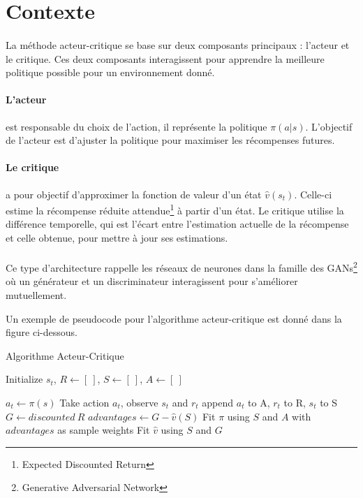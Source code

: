 \section{Contexte}

\paragraph{}
La méthode acteur-critique se base sur deux composants principaux : l'acteur et le critique. 
Ces deux composants interagissent pour apprendre la meilleure politique possible pour un environnement donné.

\paragraph{L'acteur} est responsable du choix de l'action, il représente la politique $\pi(a|s)$. 
L'objectif de l'acteur est d'ajuster la politique pour maximiser les récompenses futures.

\paragraph{Le critique} a pour objectif d'approximer la fonction de valeur d'un état $\hat{v}(s_t)$. 
Celle-ci estime la récompense réduite attendue\footnote{Expected Discounted Return} à partir d'un état.
Le critique utilise la différence temporelle, 
qui est l'écart entre l'estimation actuelle de la récompense et celle obtenue, pour mettre à jour ses estimations.

\paragraph{}
Ce type d'architecture rappelle les réseaux de neurones dans la famille des GANs\footnote{Generative Adversarial Network} 
où un générateur et un discriminateur interagissent pour s'améliorer mutuellement.


Un exemple de pseudocode pour l'algorithme acteur-critique est donné dans la figure ci-dessous.
\begin{algorithm}
\caption{Algorithme Acteur-Critique}\label{alg:a2c}
\begin{algorithmic}

\State Initialize $s_t$, $R \gets [~]$, $S \gets [~]$, $A \gets [~]$

\State $a_t \gets \pi(s)$ 
\State Take action $a_t$, observe $s_t$ and $r_t$
\State append $a_t$ to A, $r_t$ to R, $s_t$ to S
\State $G \gets discounted~R$
\State $advantages \gets G - \hat{v}(S)$
\State Fit $\pi$ using \(S\) and \(A\) with $advantages$ as sample weights
\State Fit $\hat{v}$ using \(S\) and \(G\)
\EndIf
\EndFor
\EndFor
\end{algorithmic}
\end{algorithm}

